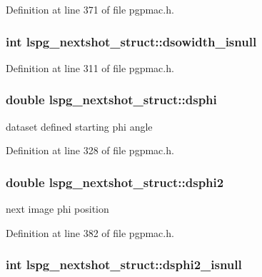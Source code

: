 Definition at line 371 of file pgpmac.\-h.

\hypertarget{structlspg__nextshot__struct_a5dd3db64790e09bc03499e521bbaa126}{
\subsubsection[{dsowidth\-\_\-isnull}]{\setlength{\rightskip}{0pt plus 5cm}int lspg\-\_\-nextshot\-\_\-struct\-::dsowidth\-\_\-isnull}}\label{structlspg__nextshot__struct_a5dd3db64790e09bc03499e521bbaa126}


Definition at line 311 of file pgpmac.\-h.

\hypertarget{structlspg__nextshot__struct_a64ebde597ca97a3b98145dc2d580c64f}{
\subsubsection[{dsphi}]{\setlength{\rightskip}{0pt plus 5cm}double lspg\-\_\-nextshot\-\_\-struct\-::dsphi}}\label{structlspg__nextshot__struct_a64ebde597ca97a3b98145dc2d580c64f}


dataset defined starting phi angle 



Definition at line 328 of file pgpmac.\-h.

\hypertarget{structlspg__nextshot__struct_a98857616b6bbb6ba861e96b6b7551756}{
\subsubsection[{dsphi2}]{\setlength{\rightskip}{0pt plus 5cm}double lspg\-\_\-nextshot\-\_\-struct\-::dsphi2}}\label{structlspg__nextshot__struct_a98857616b6bbb6ba861e96b6b7551756}


next image phi position 



Definition at line 382 of file pgpmac.\-h.

\hypertarget{structlspg__nextshot__struct_a57a9c43be86188f65b96d59c2adec674}{
\subsubsection[{dsphi2\-\_\-isnull}]{\setlength{\rightskip}{0pt plus 5cm}int lspg\-\_\-nextshot\-\_\-struct\-::dsphi2\-\_\-isnull}}\label{structlspg__nextshot__struct_a57a9c43be86188f65b96d59c2adec674}


